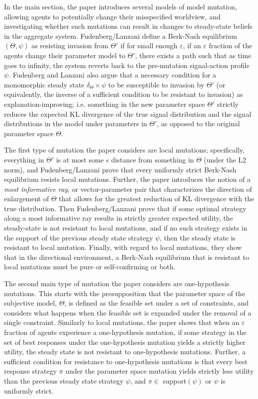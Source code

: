 \documentclass[10pt,letter]{article}
\begin{document}
In the main section, the paper introduces several models of model mutation, allowing agents to potentially change their misspecified worldview, and investigating whether such mutations can result in changes to steady-state beliefs in the aggregate system. Fudenberg/Lanzani define a Berk-Nash equilibrium $(\Theta, \psi)$ as resisting invasion from $\Theta'$ if for small enough $\varepsilon$, if an $\varepsilon$ fraction of the agents change their parameter model to $\Theta'$, there exists a path such that as time goes to infinity, the system reverts back to the pre-mutation signal-action profile $\psi$. Fudenberg and Lanzani also argue that a necessary condition for a monomorphic steady state $\delta_\Theta \times \psi $ to be susceptible to invasion by $\Theta'$ (or equivalently, the inverse of a sufficient condition to be resistant to invasion) as explanation-improving; i.e. something in the new parameter space $\Theta'$ strictly reduces the expected KL divergence of the true signal distribution and the signal distributions in the model under parameters in $\Theta'$, as opposed to the original parameter space $\Theta$.

The first type of mutation the paper considers are local mutations; specifically, everything in $\Theta'$ is at most some $\epsilon$ distance from something in $\Theta$ (under the L2 norm), and Fudenberg/Lanzani prove that every uniformly strict Berk-Nash equilibrium resists local mutations. Further, the paper introduces the notion of a \textit{most informative ray}, or vector-parameter pair that characterizes the direction of enlargement of $\Theta$ that allows for the greatest reduction of KL divergence with the true distribution. Then Fudenberg/Lanzani prove that if some optimal strategy along a most informative ray results in strictly greater expected utility, the steady-state is not resistant to local mutations, and if no such strategy exists in the support of the previous steady state strategy $\psi$, then the steady state is resistant to local mutation. Finally, with regard to local mutations, they show that in the directional environment, a Berk-Nash equilibrium that is resistant to local mutations must be pure or self-confirming or both.

The second main type of mutation the paper considers are one-hypothesis mutations. This starts with the presupposition that the parameter space of the subjective model, $\Theta$, is defined as the feasible set under a set of constraints, and considers what happens when the feasible set is expanded under the removal of a single constraint. Similarly to local mutations, the paper shows that when an $\varepsilon$ fraction of agents experience a one-hypothesis mutation, if some strategy in the set of best responses under the one-hypothesis mutation yields a strictly higher utility, the steady state is not resistant to one-hypothesis mutations. Further, a sufficient condition for resistance to one-hypothesis mutations is that every best response strategy $\pi$ under the parameter space mutation yields strictly less utility than the previous steady state strategy $\psi$, and $\pi \in $ support$(\psi)$ or $\psi$ is uniformly strict.
\end{document}
